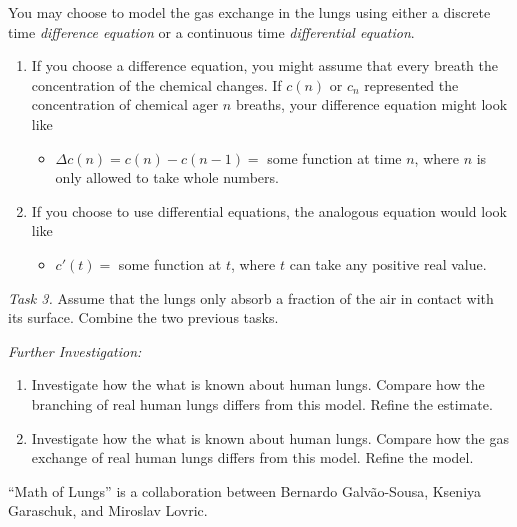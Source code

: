 \begin{graybox}
You may choose to model the gas exchange in the lungs using either a discrete time \emph{difference equation} or a continuous time \emph{differential equation}.
	\begin{enumerate}[label=\emph{(\alph*)}]
	\item If you choose a difference equation, you might assume that every breath the concentration of the chemical changes. If $c(n)$ or $c_n$ represented the concentration of chemical ager $n$ breaths, your difference equation might look like
	\begin{itemize}
		\item $\Delta c(n) = c(n) - c(n-1) =$ some function at time $n$, where $n$ is only allowed to take whole numbers.
	\end{itemize}

	\item If you choose to use differential equations, the analogous equation would look like
	\begin{itemize}
		\item $c'(t)=$ some function at $t$, where $t$ can take any positive real value.  
	\end{itemize}
\end{enumerate}
\end{graybox}

\vfill

\emph{Task 3. } Assume that the lungs only absorb a fraction of the air in contact with its surface. Combine the two previous tasks.

\vfill

\emph{Further Investigation:}
\begin{enumerate}[label=\emph{\arabic*.}]
	\item Investigate how the what is known about human lungs. Compare how the branching of real human lungs differs from this model. Refine the estimate.
	\item Investigate how the what is known about human lungs. Compare how the gas exchange of real human lungs differs from this model. Refine the model.
\end{enumerate}

\vspace{1cm}



\hfill ``Math of Lungs'' is a collaboration between Bernardo Galv\~ao-Sousa, Kseniya Garaschuk, and Miroslav Lovric.

\begin{noexercises}
\end{noexercises}
